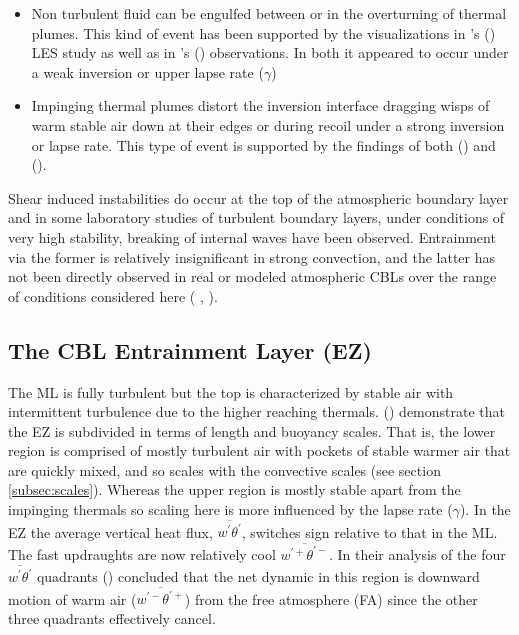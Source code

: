 \begin{itemize}

\item{Non turbulent fluid can be engulfed between or in the overturning of thermal plumes. This kind of event has been supported by the visualizations in \citeauthor{SullMoengStev}'s (\citeyear{SullMoengStev}) \acs{LES} study as well as in \citeauthor{Traum11}'s (\citeyear{Traum11}) observations. In both it appeared to occur under a weak inversion or upper lapse rate ($\gamma$)}

\item{
Impinging thermal plumes distort the inversion interface dragging wisps of warm stable air down at their edges or during recoil under a strong inversion or lapse rate. This type of event is supported by the findings  of both \citeauthor{SullMoengStev} (\citeyear{SullMoengStev}) and \citeauthor{Traum11} (\citeyear{Traum11}).}

\end{itemize}

Shear induced instabilities do occur at the top of the atmospheric boundary layer and in some laboratory studies of turbulent boundary layers, under conditions of very high stability, breaking of internal waves have been observed.  Entrainment via the former is relatively insignificant in strong convection, and the latter has not been directly observed in real or modeled atmospheric \acs{CBL}s over the range of conditions considered here (\citeauthor{Traum11} \citeyear{Traum11}, \citeauthor{SullMoengStev} \citeyear{SullMoengStev}).

\subsection{The CBL Entrainment Layer (EZ)}
\label{subsec:cblel}

The \acs{ML} is fully turbulent but the top is characterized by stable air with intermittent turbulence due to the higher reaching thermals. \citeauthor{GarciaMellado} (\citeyear{GarciaMellado}) demonstrate that the \acs{EZ} is subdivided in terms of length and buoyancy scales.  That is, the lower region is comprised of mostly turbulent air with pockets of stable warmer air that are quickly mixed, and so scales with the convective scales (see section \ref{subsec:scales}). Whereas the upper region is mostly stable apart from the impinging thermals so scaling here is more influenced by the lapse rate ($\gamma$).  In the \acs{EZ} the average vertical heat flux, $\overline{w^{'}\theta^{'}}$, switches sign relative to that in the \acs{ML}.  The fast updraughts are now relatively cool $\overline{w^{'+}\theta^{'-}}$.  In their analysis of the four $\overline{w^{'}\theta^{'}}$ quadrants \citeauthor{SullMoengStev} (\citeyear{SullMoengStev}) concluded that the net dynamic in this region is downward motion of warm air ($\overline{w^{'-}\theta^{'+}}$) from the free atmosphere (\acs{FA}) since the other three quadrants effectively cancel.\\

